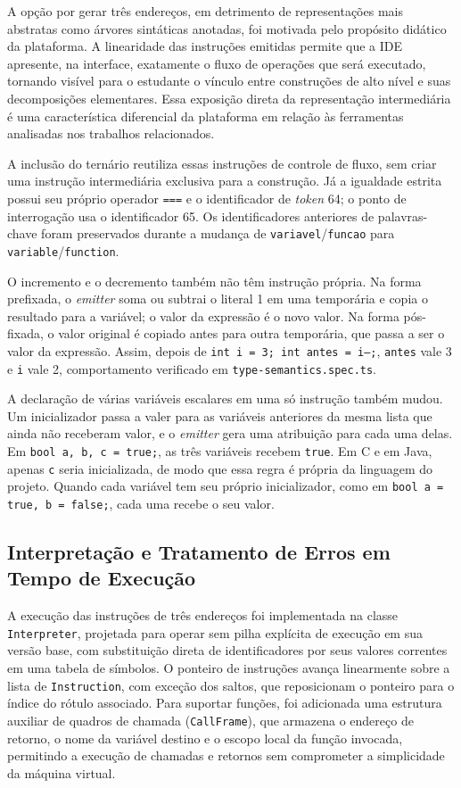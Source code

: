 A opção por gerar três endereços, em detrimento de representações mais abstratas como árvores sintáticas anotadas, foi motivada pelo propósito didático da plataforma. A linearidade das instruções emitidas permite que a IDE apresente, na interface, exatamente o fluxo de operações que será executado, tornando visível para o estudante o vínculo entre construções de alto nível e suas decomposições elementares. Essa exposição direta da representação intermediária é uma característica diferencial da plataforma em relação às ferramentas analisadas nos trabalhos relacionados.

A inclusão do ternário reutiliza essas instruções de controle de fluxo, sem criar uma instrução intermediária exclusiva para a construção. Já a igualdade estrita possui seu próprio operador \texttt{===} e o identificador de \textit{token} 64; o ponto de interrogação usa o identificador 65. Os identificadores anteriores de palavras-chave foram preservados durante a mudança de \texttt{variavel}/\texttt{funcao} para \texttt{variable}/\texttt{function}.

O incremento e o decremento também não têm instrução própria. Na forma prefixada, o \textit{emitter} soma ou subtrai o literal 1 em uma temporária e copia o resultado para a variável; o valor da expressão é o novo valor. Na forma pós-fixada, o valor original é copiado antes para outra temporária, que passa a ser o valor da expressão. Assim, depois de \texttt{int i = 3; int antes = i--;}, \texttt{antes} vale 3 e \texttt{i} vale 2, comportamento verificado em \texttt{type-semantics.spec.ts}.

A declaração de várias variáveis escalares em uma só instrução também mudou. Um inicializador passa a valer para as variáveis anteriores da mesma lista que ainda não receberam valor, e o \textit{emitter} gera uma atribuição para cada uma delas. Em \texttt{bool a, b, c = true;}, as três variáveis recebem \texttt{true}. Em C e em Java, apenas \texttt{c} seria inicializada, de modo que essa regra é própria da linguagem do projeto. Quando cada variável tem seu próprio inicializador, como em \texttt{bool a = true, b = false;}, cada uma recebe o seu valor.

\subsection{Interpretação e Tratamento de Erros em Tempo de Execução}
\label{subsec:interpretacao}

A execução das instruções de três endereços foi implementada na classe \texttt{Interpreter}, projetada para operar sem pilha explícita de execução em sua versão base, com substituição direta de identificadores por seus valores correntes em uma tabela de símbolos. O ponteiro de instruções avança linearmente sobre a lista de \texttt{Instruction}, com exceção dos saltos, que reposicionam o ponteiro para o índice do rótulo associado. Para suportar funções, foi adicionada uma estrutura auxiliar de quadros de chamada (\texttt{CallFrame}), que armazena o endereço de retorno, o nome da variável destino e o escopo local da função invocada, permitindo a execução de chamadas e retornos sem comprometer a simplicidade da máquina virtual.

